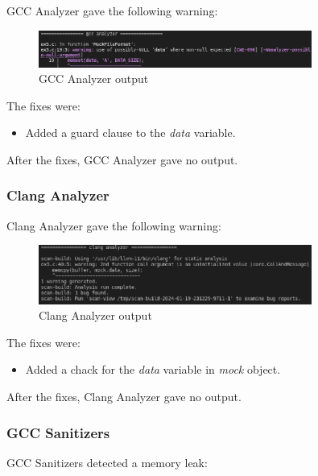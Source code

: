 \documentclass{article}
\begin{document}
GCC Analyzer gave the following warning:

\begin{figure}[ht!]
    \centering
    \includegraphics[width=0.8\textwidth]{images/ex5/gccAnalyzer.png}
    \caption{GCC Analyzer output}\label{fig:ex5/gccAnalyzer}
\end{figure}

The fixes were:

\begin{itemize}
    \item Added a guard clause to the \textit{data} variable.
\end{itemize}

After the fixes, GCC Analyzer gave no output.

\subsubsection{Clang Analyzer}

Clang Analyzer gave the following warning:

\begin{figure}[ht!]
    \centering
    \includegraphics[width=0.8\textwidth]{images/ex5/clangAnalyzer.png}
    \caption{Clang Analyzer output}\label{fig:ex5/clangAnalyzer}
\end{figure}

The fixes were:

\begin{itemize}
    \item Added a chack for the \textit{data} variable in \textit{mock} object.
\end{itemize}

After the fixes, Clang Analyzer gave no output.

\subsubsection{GCC Sanitizers}

GCC Sanitizers detected a memory leak:
\end{document}
